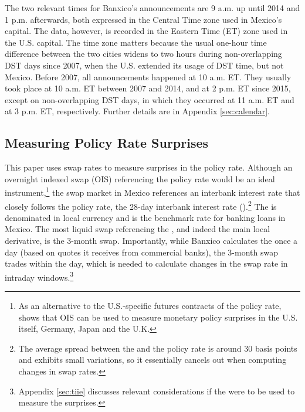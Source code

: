 The two relevant times for Banxico's announcements are 9 a.m. up until 2014 and 1 p.m. afterwards, both expressed in the Central Time zone used in Mexico's capital. The data, however, is recorded in the Eastern Time (ET) zone used in the U.S. capital. The time zone matters because the usual one-hour time difference between the two cities widens to two hours during non-overlapping DST days since 2007, when the U.S. extended its usage of DST time, but not Mexico. Before 2007, all announcements happened at 10 a.m. ET. They usually took place at 10 a.m. ET between 2007 and 2014, and at 2 p.m. ET since 2015, except on non-overlapping DST days, in which they occurred at 11 a.m. ET and at 3 p.m. ET, respectively. 
Further details are in Appendix \ref{sec:calendar}.

\sectitlespace
\subsection{Measuring Policy Rate Surprises} \label{sec:prs}
\sectitlespace

This paper uses swap rates to measure surprises in the policy rate. Although an overnight indexed swap (OIS) referencing the policy rate would be an ideal instrument,\footnote{ As an alternative to the U.S.-specific futures contracts of the policy rate, \textcite{Lloyd:2018a} shows that OIS can be used to measure monetary policy surprises in the U.S. itself, Germany, Japan and the U.K.} the swap market in Mexico references an interbank interest rate that closely follows the policy rate, the 28-day interbank interest rate (\tiie).\footnote{The average spread between the \tiie{} and the policy rate is around 30 basis points and exhibits small variations, so it essentially cancels out when computing changes in swap rates.} The \tiie{} is denominated in local currency and is the benchmark rate for banking loans in Mexico. The most liquid swap referencing the \tiie{}, and indeed the main local derivative, is the 3-month swap. Importantly, while Banxico calculates the \tiie{} once a day (based on quotes it receives from commercial banks), the 3-month swap trades within the day, which is needed to calculate changes in the swap rate in intraday windows.\footnote{Appendix \ref{sec:tiie} discusses relevant considerations if the \tiie{} were to be used to measure the surprises.} 

